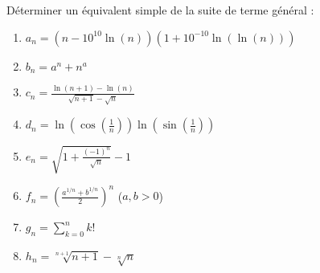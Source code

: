\documentclass[solutions]{exercices}
\begin{document}
\begin{exercice}
	Déterminer un équivalent simple de la suite de terme général :
	\begin{multicols}{2}
		\begin{enumerate}[]
			\item ${\displaystyle a_n = ( n - 10^{10} \ln(n) ) ( 1 + 10^{-10}\ln(\ln(n)) )}$
			\item ${\displaystyle b_n = a^n + n^a}$
			\item ${\displaystyle c_n = \frac{\ln(n+1) - \ln(n)}{\sqrt{n+1} - \sqrt{n}}}$
			\item ${\displaystyle d_n = \ln( \cos ( \frac{1}{n} ) ) \ln( \sin ( \frac{1}{n} ) )}$
			\item ${\displaystyle e_n = \sqrt{1 + \frac{(-1)^n}{\sqrt{n}}} - 1 }$
			\item [\st] ${\displaystyle f_n = \left( \frac{a^{1/n} + b^{1/n}}{2} \right)^n}$ ($a,b>0$)
			\item ${\displaystyle g_n = \sum_{k=0}^n k! }$
			\item [\st] ${\displaystyle h_n = \sqrt[n+1]{n+1} - \sqrt[n]{n}}$
		\end{enumerate}
	\end{multicols}
\end{exercice}
\end{document}
